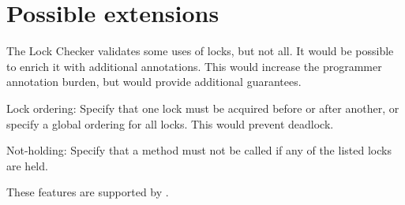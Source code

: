 

\section{Possible extensions\label{lock-extensions}}

The Lock Checker validates some uses of locks, but not all.  It would be
possible to enrich it with additional annotations.  This would increase the
programmer annotation burden, but would provide additional guarantees.

Lock ordering:  Specify that one lock must be acquired before or after
another, or specify a global ordering for all locks.  This would prevent
deadlock.

Not-holding:  Specify that a method must not be called if any of the listed
locks are held.

These features are supported by 
.



